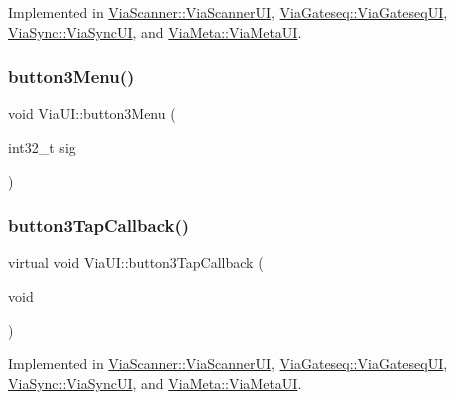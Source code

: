 Implemented in \mbox{\hyperlink{class_via_scanner_1_1_via_scanner_u_i_ac01a2eda088067d96b7691255d2841c6}{Via\+Scanner\+::\+Via\+Scanner\+UI}}, \mbox{\hyperlink{class_via_gateseq_1_1_via_gateseq_u_i_a662b7cd49c71accc227fb74611e8aab2}{Via\+Gateseq\+::\+Via\+Gateseq\+UI}}, \mbox{\hyperlink{class_via_sync_1_1_via_sync_u_i_af7088ee62cddc1187af86e970efe643a}{Via\+Sync\+::\+Via\+Sync\+UI}}, and \mbox{\hyperlink{class_via_meta_1_1_via_meta_u_i_a124e9edd67310235839dae92aa4bb9a9}{Via\+Meta\+::\+Via\+Meta\+UI}}.

\mbox{\label{class_via_u_i_a4c6811c74f2c1cfadd84be925ed905fc}} 
\subsubsection{\texorpdfstring{button3\+Menu()}{button3Menu()}}
{\footnotesize\ttfamily void Via\+U\+I\+::button3\+Menu (\begin{DoxyParamCaption}\item[{int32\+\_\+t}]{sig }\end{DoxyParamCaption})}

\mbox{\label{class_via_u_i_a3dfd40d901aaa8c8310bdbf75f4432a5}} 
\subsubsection{\texorpdfstring{button3\+Tap\+Callback()}{button3TapCallback()}}
{\footnotesize\ttfamily virtual void Via\+U\+I\+::button3\+Tap\+Callback (\begin{DoxyParamCaption}\item[{void}]{ }\end{DoxyParamCaption})\hspace{0.3cm}{\ttfamily [pure virtual]}}



Implemented in \mbox{\hyperlink{class_via_scanner_1_1_via_scanner_u_i_ac4c5b6ba60ade672ebe768c9d4849d62}{Via\+Scanner\+::\+Via\+Scanner\+UI}}, \mbox{\hyperlink{class_via_gateseq_1_1_via_gateseq_u_i_abce5bbab2316b9c0bc3cfedbaaeeef73}{Via\+Gateseq\+::\+Via\+Gateseq\+UI}}, \mbox{\hyperlink{class_via_sync_1_1_via_sync_u_i_ad51f33a8fd5ae243997f864436dadcae}{Via\+Sync\+::\+Via\+Sync\+UI}}, and \mbox{\hyperlink{class_via_meta_1_1_via_meta_u_i_a67e200e126a39d85d79f1f81f25e48a5}{Via\+Meta\+::\+Via\+Meta\+UI}}.

